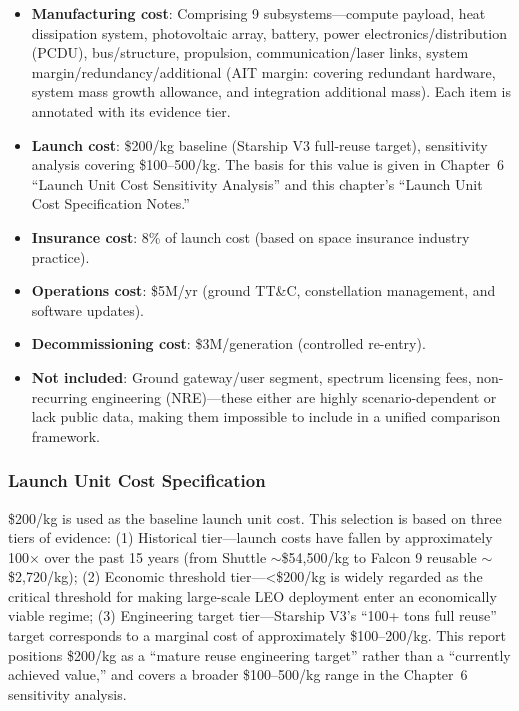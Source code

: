 \begin{itemize}[leftmargin=*]
    \item \textbf{Manufacturing cost}: Comprising 9 subsystems---compute payload, heat dissipation system, photovoltaic array, battery, power electronics/distribution (PCDU), bus/structure, propulsion, communication/laser links, system margin/redundancy/additional (AIT margin: covering redundant hardware, system mass growth allowance, and integration additional mass). Each item is annotated with its evidence tier.
    \item \textbf{Launch cost}: \$200/kg baseline (Starship V3 full-reuse target), sensitivity analysis covering \$100--500/kg. The basis for this value is given in Chapter~6 ``Launch Unit Cost Sensitivity Analysis'' and this chapter's ``Launch Unit Cost Specification Notes.''
    \item \textbf{Insurance cost}: 8\% of launch cost (based on space insurance industry practice).
    \item \textbf{Operations cost}: \$5M/yr (ground TT\&C, constellation management, and software updates).
    \item \textbf{Decommissioning cost}: \$3M/generation (controlled re-entry).
    \item \textbf{Not included}: Ground gateway/user segment, spectrum licensing fees, non-recurring engineering (NRE)---these either are highly scenario-dependent or lack public data, making them impossible to include in a unified comparison framework.
\end{itemize}

\subsubsection{Launch Unit Cost Specification}

\$200/kg is used as the baseline launch unit cost. This selection is based on three tiers of evidence: (1) Historical tier---launch costs have fallen by approximately 100$\times$ over the past 15 years (from Shuttle $\sim$\$54,500/kg to Falcon 9 reusable $\sim$\$2,720/kg)\cite{nasalaunch2018}; (2) Economic threshold tier---\textless\$200/kg is widely regarded as the critical threshold for making large-scale LEO deployment enter an economically viable regime; (3) Engineering target tier---Starship V3's ``100+ tons full reuse'' target corresponds to a marginal cost of approximately \$100--200/kg\cite{33fg2026starship}. This report positions \$200/kg as a ``mature reuse engineering target'' rather than a ``currently achieved value,'' and covers a broader \$100--500/kg range in the Chapter~6 sensitivity analysis.

